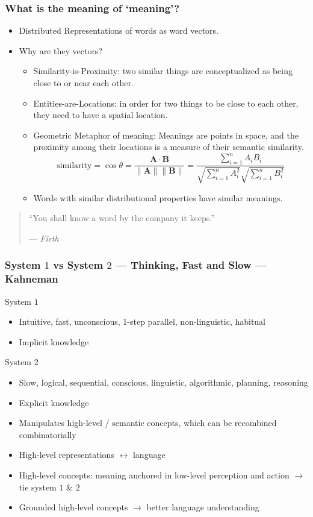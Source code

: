 \documentclass[UTF8,11pt,colorlinks,compress,openany]{beamer}%
\begin{document}
\begin{frame}\frametitle{What is the meaning of `meaning'?}
\begin{itemize}
	\item Distributed Representations of words as word vectors.
	\item Why are they vectors?
	\begin{itemize}
		\item Similarity-is-Proximity: two similar things are conceptualized as being close to or near each other.
		\item Entities-are-Locations: in order for two things to be close to each other, they need to have a spatial location.
		\item Geometric Metaphor of meaning: Meanings are points in space, and the proximity among their locations is a measure of their semantic similarity.
		\[\displaystyle{\text{similarity}}=\cos\theta = \frac{\mathbf{A} \cdot \mathbf{B}}{\|\mathbf{A}\| \|\mathbf{B}\|} = \frac{\sum\limits_{i=1}^n A_iB_i}{\sqrt{\sum\limits_{i=1}^n{A_i^2}} \sqrt{\sum\limits_{i=1}^n{B_i^2}}}\]
		\item Words with similar distributional properties have similar meanings.
	\end{itemize}
\end{itemize}
\begin{quote}
``You shall know a word by the company it keeps.''\par
\hfill --- \textsl{Firth}
\end{quote}
\end{frame}

\begin{frame}\frametitle{System $1$ vs System $2$ --- Thinking, Fast and Slow --- Kahneman}
\begin{block}{System $1$}
\begin{itemize}
	\item Intuitive, fast, unconscious, $1$-step parallel, non-linguistic, habitual
	\item Implicit knowledge
\end{itemize}	
\end{block}
\begin{block}{System $2$}
\begin{itemize}
	\item Slow, logical, sequential, conscious, linguistic, algorithmic, planning, reasoning 
	\item Explicit knowledge
	\item Manipulates high-level / semantic concepts, which can be recombined combinatorially
\end{itemize}	
\end{block}
\begin{itemize}
	\item High-level representations $\leftrightarrow$ language
	\item High-level concepts: meaning anchored in low-level perception and action $\to$ tie system $1$ \& $2$
	\item Grounded high-level concepts $\to$ better language understanding
\end{itemize}
\end{frame}
\end{document}
